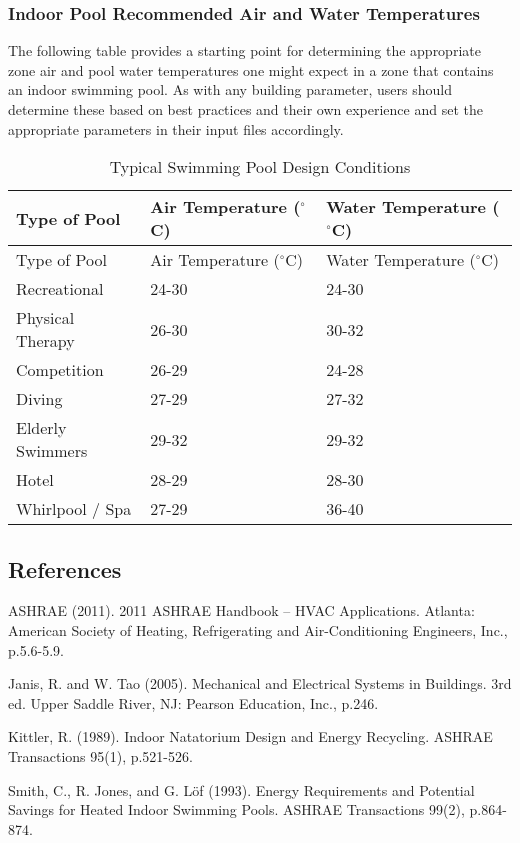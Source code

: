 \subsubsection{Indoor Pool Recommended Air and Water Temperatures}\label{indoor-pool-recommended-air-and-water-temperatures}

The following table provides a starting point for determining the appropriate zone air and pool water temperatures one might expect in a zone that contains an indoor swimming pool.  As with any building parameter, users should determine these based on best practices and their own experience and set the appropriate parameters in their input files accordingly.

\begin{longtable}[c]{@{}lll@{}}
\caption{Typical Swimming Pool Design Conditions \label{table:typical-swimming-pool-design-conditions}} \tabularnewline
\toprule 
Type of Pool & Air Temperature (\(^{\circ}\)C) & Water Temperature (\(^{\circ}\)C) \tabularnewline
\midrule
\endfirsthead

\toprule 
Type of Pool & Air Temperature (\(^{\circ}\)C) & Water Temperature (\(^{\circ}\)C) \tabularnewline
\midrule
\endhead

Recreational & 24-30 & 24-30 \tabularnewline
Physical Therapy & 26-30 & 30-32 \tabularnewline
Competition & 26-29 & 24-28 \tabularnewline
Diving & 27-29 & 27-32 \tabularnewline
Elderly Swimmers & 29-32 & 29-32 \tabularnewline
Hotel & 28-29 & 28-30 \tabularnewline
Whirlpool / Spa & 27-29 & 36-40 \tabularnewline
\bottomrule
\end{longtable}

\subsection{References}\label{references-030}

ASHRAE (2011). 2011 ASHRAE Handbook -- HVAC Applications. Atlanta: American Society of Heating, Refrigerating and Air-Conditioning Engineers, Inc., p.5.6-5.9.

Janis, R. and W. Tao (2005). Mechanical and Electrical Systems in Buildings. 3rd ed. Upper Saddle River, NJ: Pearson Education, Inc., p.246.

Kittler, R. (1989). Indoor Natatorium Design and Energy Recycling. ASHRAE Transactions 95(1), p.521-526.

Smith, C., R. Jones, and G. Löf (1993). Energy Requirements and Potential Savings for Heated Indoor Swimming Pools. ASHRAE Transactions 99(2), p.864-874.
